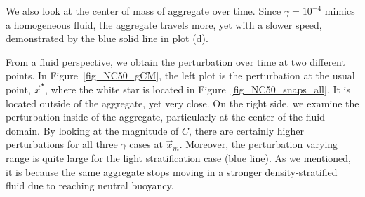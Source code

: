 We also look at the center of mass of aggregate over time. Since $\gamma = 10^{-4}$ mimics a homogeneous fluid, the aggregate travels more, yet with a slower speed, demonstrated by the blue solid line in plot (d).
\par
From a fluid perspective, we obtain the perturbation over time at two different points. In Figure~\ref{fig_NC50_gCM}, the left plot is the perturbation at the usual point, $\vec{x}^{\star}$, where the white star is located in Figure~\ref{fig_NC50_snaps_all}. It is located outside of the aggregate, yet very close. On the right side, we examine the perturbation inside of the aggregate, particularly at the center of the fluid domain. By looking at the magnitude of $C$, there are certainly higher perturbations for all three $\gamma$ cases at $\vec{x}_m$. Moreover, the perturbation varying range is quite large for the light stratification case (blue line). As we mentioned, it is because the same aggregate stops moving in a stronger density-stratified fluid due to reaching neutral buoyancy.
